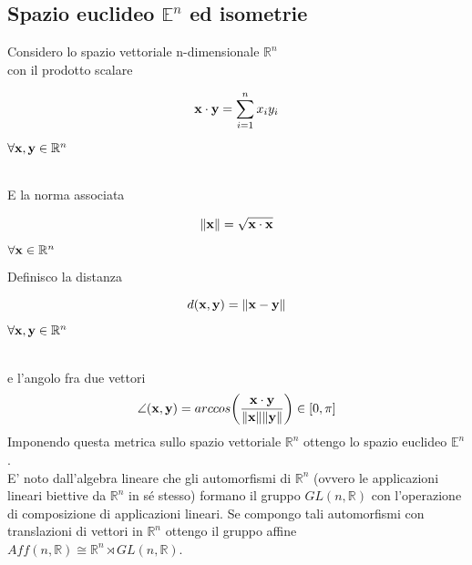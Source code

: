 \documentclass[10pt,a4paper]{article}
\begin{document}
\subsection{Spazio euclideo $\mathbb{E}^n$ ed isometrie}
Considero lo spazio vettoriale n-dimensionale $\mathbb{R}^{n}$  \\
con il prodotto scalare  \hfill
\begin{minipage}{0.3\textwidth}
\[
  \vb{x} \cdot \vb{y} =  \sum_{i=1}^{n} x_i y_i    
\]
\end{minipage} \hfill
\begin{minipage}{0.3\textwidth}
$ \forall \vb{x} , \vb{y} \in \mathbb{R}^{n}$
\end{minipage} \\
E la norma associata   \hfill             
\begin{minipage}{0.3\textwidth}
\[
  \norm{\vb{x}} =  \sqrt{\vb{x} \cdot \vb{x}}
\]
\end{minipage} \hfill
\begin{minipage}{0.3\textwidth}
$ \forall \vb{x} \in \mathbb{R}^{n}$
\end{minipage} \newline
Definisco la distanza \hfill 
\begin{minipage}{0.3\textwidth}
\[ d(\vb{x}, \vb{y} ) = \norm{\vb{x-y}}\] 
\end{minipage} \hfill
\begin{minipage}{0.3\textwidth}
$ \forall \vb{x} , \vb{y} \in \mathbb{R}^{n}$
\end{minipage} \\
e l'angolo fra due vettori \hfill
\[ \angle (\vb{x},\vb{y}) = arccos \bigg( \frac{\vb{x} \cdot \vb{y}}{\norm{\vb{x}} \norm{\vb{y}}} \bigg) \in [0, \pi] \]
Imponendo questa metrica sullo spazio vettoriale $\mathbb{R}^n$ ottengo lo spazio euclideo $\mathbb{E}^n$. \\
E' noto dall'algebra lineare che gli automorfismi di $\mathbb{R}^n$ (ovvero le applicazioni lineari biettive da $\mathbb{R}^n$ in sé stesso) formano il gruppo $ GL(n, \mathbb{R}) $ con l'operazione di composizione di applicazioni lineari. Se compongo tali automorfismi con translazioni di vettori in $\mathbb{R}^n$ ottengo il gruppo affine $Aff(n, \mathbb{R}) \cong \mathbb{R}^{n} \rtimes GL(n, \mathbb{R})$. 
\end{document}

